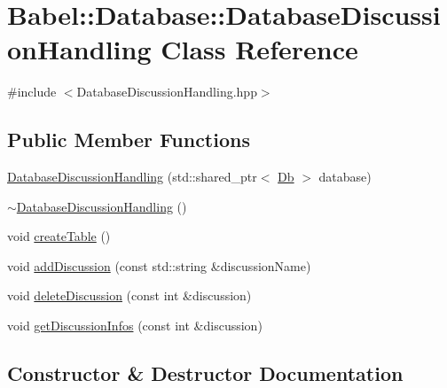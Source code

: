 \hypertarget{classBabel_1_1Database_1_1DatabaseDiscussionHandling}{}\section{Babel\+:\+:Database\+:\+:Database\+Discussion\+Handling Class Reference}
\label{classBabel_1_1Database_1_1DatabaseDiscussionHandling}


{\ttfamily \#include $<$Database\+Discussion\+Handling.\+hpp$>$}

\subsection*{Public Member Functions}
\begin{DoxyCompactItemize}
\item 
\hyperlink{classBabel_1_1Database_1_1DatabaseDiscussionHandling_ad0f6b33adad16b679ff11005d09f0eac}{Database\+Discussion\+Handling} (std\+::shared\+\_\+ptr$<$ \hyperlink{classBabel_1_1Database_1_1Db}{Db} $>$ database)
\item 
\hyperlink{classBabel_1_1Database_1_1DatabaseDiscussionHandling_a89cd8d05df9723a22f05e4195446676b}{$\sim$\+Database\+Discussion\+Handling} ()
\item 
void \hyperlink{classBabel_1_1Database_1_1DatabaseDiscussionHandling_a6c7bbeaff0af08cdd8b6703731c008c6}{create\+Table} ()
\item 
void \hyperlink{classBabel_1_1Database_1_1DatabaseDiscussionHandling_a634438a29f8c9b4091e4f7ee030acf80}{add\+Discussion} (const std\+::string \&discussion\+Name)
\item 
void \hyperlink{classBabel_1_1Database_1_1DatabaseDiscussionHandling_a2f07cfa4efafa1db0c6014eba5380088}{delete\+Discussion} (const int \&discussion)
\item 
void \hyperlink{classBabel_1_1Database_1_1DatabaseDiscussionHandling_ab4071036b7704d7acba7c09aa77c9d89}{get\+Discussion\+Infos} (const int \&discussion)
\end{DoxyCompactItemize}


\subsection{Constructor \& Destructor Documentation}
\mbox{\label{classBabel_1_1Database_1_1DatabaseDiscussionHandling_ad0f6b33adad16b679ff11005d09f0eac}} 
